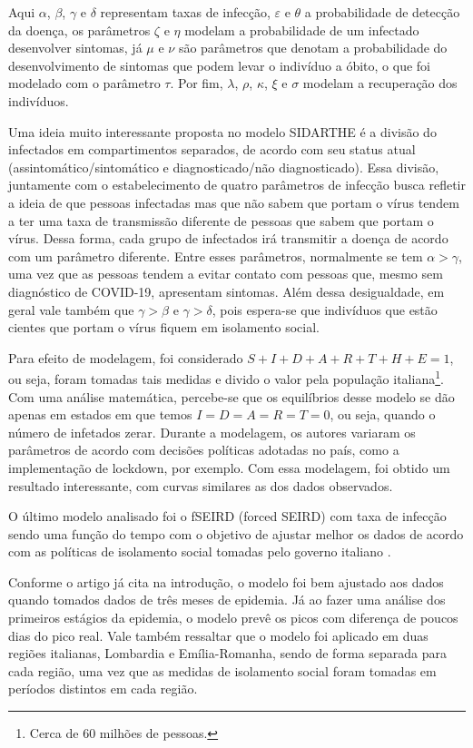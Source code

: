\documentclass{article}
\begin{document}
Aqui $\alpha$, $\beta$, $\gamma$ e $\delta$ representam taxas de infecção, $\varepsilon$ e $\theta$ a probabilidade de detecção da doença, os parâmetros $\zeta$ e $\eta$ modelam a probabilidade de um infectado desenvolver sintomas, já $\mu$ e $\nu$ são parâmetros que denotam a probabilidade do desenvolvimento de sintomas que podem levar o indivíduo a óbito, o que foi modelado com o parâmetro $\tau$. Por fim, $\lambda$, $\rho$, $\kappa$, $\xi$ e $\sigma$ modelam a recuperação dos indivíduos.

Uma ideia muito interessante proposta no modelo SIDARTHE é a divisão do infectados em compartimentos separados, de acordo com seu status atual (assintomático/sintomático e diagnosticado/não diagnosticado). Essa divisão, juntamente com o estabelecimento de quatro parâmetros de infecção busca refletir a ideia de que pessoas infectadas mas que não sabem que portam o vírus tendem a ter uma taxa de transmissão diferente de pessoas que sabem que portam o vírus. Dessa forma, cada grupo de infectados irá transmitir a doença de acordo com um parâmetro diferente. Entre esses parâmetros, normalmente se tem $\alpha > \gamma$, uma vez que as pessoas tendem a evitar contato com pessoas que, mesmo sem diagnóstico de COVID-19, apresentam sintomas. Além dessa desigualdade, em geral vale também que $\gamma > \beta$ e $\gamma > \delta$, pois espera-se que indivíduos que estão cientes que portam o vírus fiquem em isolamento social.

Para efeito de modelagem, foi considerado $S + I + D + A + R + T + H + E = 1$, ou seja, foram tomadas tais medidas e divido o valor pela população italiana\footnote{Cerca de 60 milhões de pessoas.}. Com uma análise matemática, percebe-se que os equilíbrios desse modelo se dão apenas em estados em que temos $I = D = A = R = T = 0$, ou seja, quando o número de infetados zerar. Durante a modelagem, os autores variaram os parâmetros de acordo com decisões políticas adotadas no país, como a implementação de lockdown, por exemplo. Com essa modelagem, foi obtido um resultado interessante, com curvas similares as dos dados observados.

O último modelo analisado foi o fSEIRD (forced SEIRD) com taxa de infecção sendo uma função do tempo com o objetivo de ajustar melhor os dados de acordo com as políticas de isolamento social tomadas pelo governo italiano \cite{piccolomini}.

Conforme o artigo já cita na introdução, o modelo foi bem ajustado aos dados quando tomados dados de três meses de epidemia. Já ao fazer uma análise dos primeiros estágios da epidemia, o modelo prevê os picos com diferença de poucos dias do pico real. Vale também ressaltar que o modelo foi aplicado em duas regiões italianas, Lombardia e Emília-Romanha, sendo de forma separada para cada região, uma vez que as medidas de isolamento social foram tomadas em períodos distintos em cada região.
\end{document}
